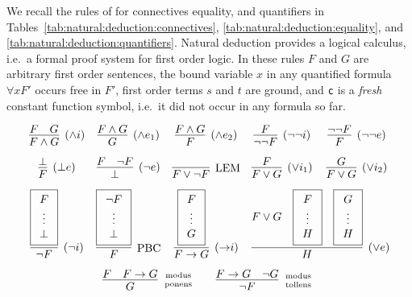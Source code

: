 
\begin{definition}\label{def:natural:deduction}
	We recall the rules of  for connectives
	equality, and quantifiers in
	Tables~\ref{tab:natural:deduction:connectives},
	\ref{tab:natural:deduction:equality}, and
	\ref{tab:natural:deduction:quantifiers}.
	Natural deduction provides a logical calculus,
	i.e.~a formal proof system for first order logic.
	In these rules
	\( F \) and \( G \) are arbitrary first order sentences,
	the bound variable \( x \) in any quantified formula
	\( \forall x F' \) occurs free in \( F' \),
	first order terms \( s \) and \( t \) are ground,
	and \( \mathsf{c} \) is a \emph{fresh} constant function symbol,
	i.e.~it did not occur in any formula so far.

\begin{table}[hbt]
\begin{gather*}
\begin{array}{ccccc}
\infer[(\land i)]{F\land G}{F & G}
&
\infer[(\land e_1)]{G}{F \land G}
&
\infer[(\land e_2)]{F}{F \land G}
&
\infer[(\lnot\lnot i)]{\lnot\lnot F}{F}
&
\infer[(\lnot\lnot e)]{F}{\lnot\lnot F}
\\[0.7em]
\infer[(\bot e)]{F}{\bot}
&
\infer[(\lnot e)]{\bot}{F & \lnot F}
&
\infer[\text{LEM}]{F\lor\lnot F}{}
&
\infer[(\lor i_1)]{F\lor G}{F}
&
\infer[(\lor i_2)]{F\lor G}{G}
\\[0.7em]
\infer[(\lnot i)]{\lnot F}{
	\boxed{\begin{array}{c}F \\ \vdots \\ \bot \end{array}}}
&
\infer[\text{PBC}]{F}{
	\boxed{\begin{array}{c}\lnot F \\ \vdots \\ \bot \end{array}}}
&
\infer[({\limp} i)]{F\limp G}{
	\boxed{\begin{array}{c}F \\ \vdots \\ G \end{array}
}}
&
\multicolumn{2}{l}{
	\infer[(\lor e)]{H}{
		F\lor G &
		\boxed{\begin{array}{c}F \\ \vdots \\ H \end{array}} &
		\boxed{\begin{array}{c}G \\ \vdots \\ H \end{array}}
	}
}
\\[0.7em]
&
\multicolumn{3}{r}{
\infer[\text{modus}\atop\text{ponens}]{G}{F & F\limp G}
\qquad
\infer[\text{modus}\atop\text{tollens}]{\lnot F}{F\limp G & \lnot G}
}
&
\end{array}
\end{gather*}
\caption{Natural Deduction Rules for Connectives}\label{tab:natural:deduction:connectives}
\end{table}


\end{definition}
